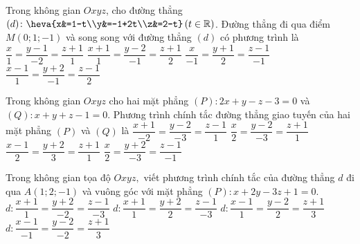 \begin{ex}%
	Trong không gian $Oxyz$, cho đường thẳng $(d)\colon \heva{x&=1-t\\y&=-1+2t\\z&=2-t}\,(t\in \mathbb{R})$. Đường thẳng đi qua điểm $M(0;1;-1)$ và song song với đường thẳng $(d)$ có phương trình là
	\choice
	{\True $\dfrac{x}{1}=\dfrac{y-1}{-2}=\dfrac{z+1}{1}$}
	{$\dfrac{x+1}{1}=\dfrac{y-2}{-1}=\dfrac{z+1}{2}$}
	{$\dfrac{x}{-1}=\dfrac{y+1}{2}=\dfrac{z-1}{-1}$}
	{$\dfrac{x-1}{1}=\dfrac{y+2}{-1}=\dfrac{z-1}{2}$}
\end{ex}
\begin{ex}%
	Trong không gian $Oxyz$ cho hai mặt phẳng $(P): 2x + y - z - 3 = 0$ và $(Q): x + y + z - 1 = 0$. Phương trình chính tắc đường thẳng giao tuyến của hai mặt phẳng $(P)$ và $(Q)$ là 
	\choice
	{$\dfrac{x+1}{-2} = \dfrac{y - 2}{-3} = \dfrac{z - 1}{1}$}
	{\True $\dfrac{x}{2} = \dfrac{y - 2}{-3} = \dfrac{z + 1}{1}$}
	{$\dfrac{x - 1}{2} = \dfrac{y + 2}{3} = \dfrac{z + 1}{1}$}
	{$\dfrac{x}{2} = \dfrac{y + 2}{-3} = \dfrac{z - 1}{-1}$}
\end{ex}
\begin{ex}%
	Trong không gian tọa độ $Oxyz,$ viết phương trình chính tắc của đường thẳng $d$ đi qua $A(1; 2; -1)$ và vuông góc với mặt phẳng $(P)\colon x+2y-3z+1=0.$
	\choice
	{$d\colon \dfrac{x+1}{1}=\dfrac{y+2}{-2}=\dfrac{z-1}{-3}$}
	{$d\colon \dfrac{x+1}{1}=\dfrac{y+2}{2}=\dfrac{z-1}{-3}$}
	{$d\colon \dfrac{x-1}{1}=\dfrac{y-2}{2}=\dfrac{z+1}{3}$}
	{\True $d\colon \dfrac{x-1}{-1}=\dfrac{y-2}{-2}=\dfrac{z+1}{3}$}
\end{ex}
